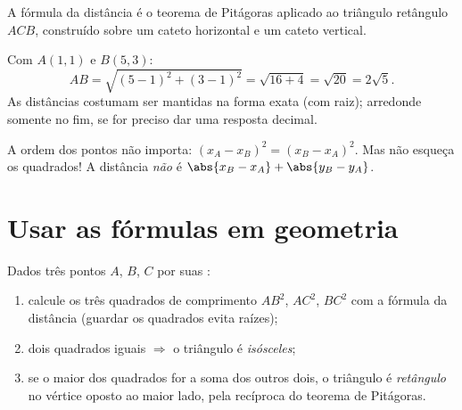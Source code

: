 \begin{omfigure}

{\small A fórmula da distância é o teorema de Pitágoras aplicado ao
triângulo retângulo $ACB$, construído sobre um cateto horizontal e um
cateto vertical.}
\end{omfigure}

\begin{example}\label{ex:g10:coordgeom:distance}
Com $A(1, 1)$ e $B(5, 3)$:
\[
AB = \sqrt{(5-1)^2 + (3-1)^2} = \sqrt{16 + 4} = \sqrt{20} = 2\sqrt 5 .
\]
As distâncias costumam ser mantidas na forma exata (com raiz); arredonde
somente no fim, se for preciso dar uma resposta decimal.
\end{example}

\begin{remark}
A ordem dos pontos não importa: $(x_A - x_B)^2 = (x_B - x_A)^2$. Mas não
esqueça os quadrados! A distância \emph{não} é
$\abs{x_B - x_A} + \abs{y_B - y_A}$.
\end{remark}

\section{Usar as fórmulas em geometria}

\begin{method}\label{met:g10:coordgeom:triangle}
Dados três pontos $A$, $B$, $C$ por suas :
\begin{enumerate}
  \item calcule os três quadrados de comprimento $AB^2$, $AC^2$, $BC^2$
        com a fórmula da distância (guardar os quadrados evita raízes);
  \item dois quadrados iguais $\Rightarrow$ o triângulo é
        \emph{isósceles};
  \item se o maior dos quadrados for a soma dos outros dois, o triângulo
        é \emph{retângulo} no vértice oposto ao maior lado, pela recíproca
        do teorema de Pitágoras.
\end{enumerate}
\end{method}

